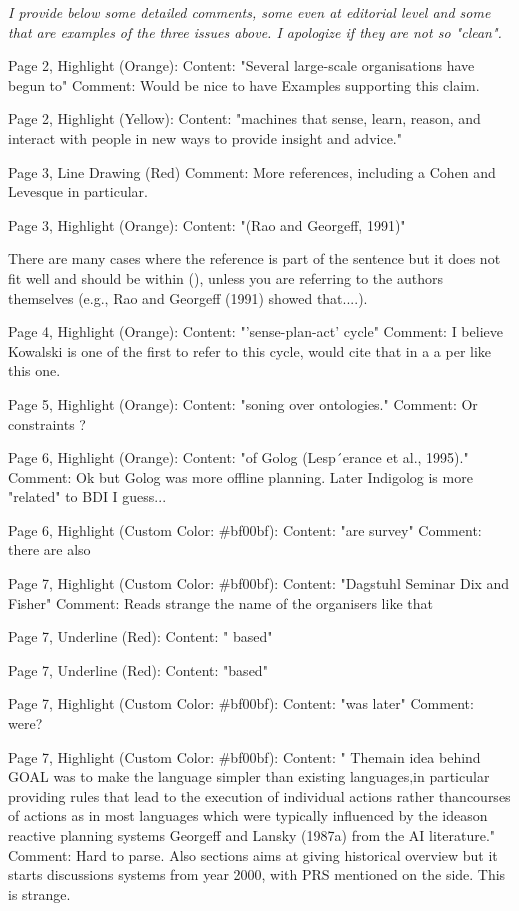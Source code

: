 \documentclass[12pt]{article}
\newenvironment{reviews}{\bigskip\itshape}{\upshape\bigskip}
\begin{document}
\begin{reviews}
I provide below some detailed comments, some even at editorial level and some that are examples of the three issues above. I apologize if they are not so "clean".


Page 2, Highlight (Orange):
Content: "Several large-scale organisations have begun to"
Comment: Would be nice to have Examples supporting this claim.

Page 2, Highlight (Yellow):
Content: "machines that sense, learn, reason, and interact with people in new ways to provide insight and advice."

Page 3, Line Drawing (Red)
Comment: More references, including a Cohen and Levesque in particular.

Page 3, Highlight (Orange):
Content: "(Rao and Georgeff, 1991)"

There are many cases where the reference is part of the sentence but it does not fit well and should be within (), unless you are referring to the authors themselves (e.g., Rao and Georgeff (1991) showed that....).

Page 4, Highlight (Orange):
Content: "'sense-plan-act' cycle"
Comment: I believe Kowalski is one of the first to refer to this cycle, would cite that in a a per like this one.

Page 5, Highlight (Orange):
Content: "soning over ontologies."
Comment: Or constraints ?

Page 6, Highlight (Orange):
Content: "of Golog (Lesp´erance et al., 1995)."
Comment: Ok but Golog was more offline planning. Later Indigolog is more "related" to BDI I guess...

Page 6, Highlight (Custom Color: \#bf00bf):
Content: "are survey"
Comment: there are also

Page 7, Highlight (Custom Color: \#bf00bf):
Content: "Dagstuhl Seminar Dix and Fisher"
Comment: Reads strange the name of the organisers like that

Page 7, Underline (Red):
Content: " based"

Page 7, Underline (Red):
Content: "based"

Page 7, Highlight (Custom Color: \#bf00bf):
Content: "was later"
Comment: were?

Page 7, Highlight (Custom Color: \#bf00bf):
Content: " Themain idea behind GOAL was to make the language simpler than existing languages,in particular providing rules that lead to the execution of individual actions rather thancourses of actions as in most languages which were typically influenced by the ideason reactive planning systems Georgeff and Lansky (1987a) from the AI literature."
Comment: Hard to parse. Also sections aims at giving historical overview but it starts discussions systems from year 2000, with PRS mentioned on the side. This is strange.


\end{reviews}
\end{document}
